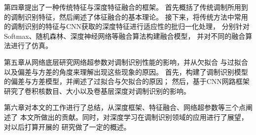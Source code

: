 第四章提出了一种传统特征与深度特征融合的框架。
首先概括了传统调制所用到的调制识别特征，然后阐述了体征融合的基本理论。
接下来，将传统方法中常用的调制识别的特征与CNN获取的深度特征进行适应性的批归一化处理，
分别针对Softmax、随机森林、深度神经网络等融合算法构建融合模型，
并对不同的融合算法进行了仿真。 \par

第五章从网络底层研究网络超参数对调制识别性能的影响，并从欠拟合
与过拟合以及偏差与方差的角度来理解出现这些现象的原因。
首先，构建了调制识别模型的偏差与方差模型，并阐述了过拟合与欠拟合的原因；
然后，基于CNN网路框架研究了卷积核数目、大小以及卷基层深度对调制识别的影响。\par

第六章对本文的工作进行了总结，从深度框架、特征融合、网络超参数等三个点阐述了
本文所做出的贡献。同时，对深度学习在调制识别领域的应用进行了展望，对以后打算开展的
研究做了一定的概述。
\par
